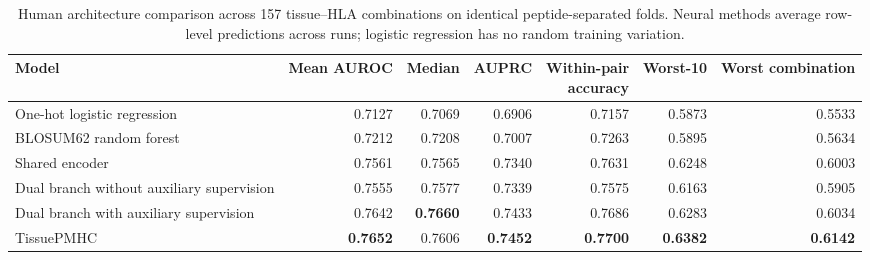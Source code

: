 \begin{table}[t]
\centering
\caption{Human architecture comparison across 157 tissue--HLA combinations on identical peptide-separated folds. Neural methods average row-level predictions across runs; logistic regression has no random training variation.}
\label{tab:human-strict-architectures}
\fontsize{7.5}{8.5}\selectfont
\renewcommand{\arraystretch}{0.98}
\setlength{\tabcolsep}{2pt}
\begin{tabularx}{\textwidth}{>{\raggedright\arraybackslash}Xrrrrrr}
\toprule
Model & Mean AUROC & Median & AUPRC & \shortstack{Within-pair\\accuracy} & Worst-10 & Worst combination \\
\midrule
One-hot logistic regression & 0.7127 & 0.7069 & 0.6906 & 0.7157 & 0.5873 & 0.5533 \\
BLOSUM62 random forest & 0.7212 & 0.7208 & 0.7007 & 0.7263 & 0.5895 & 0.5634 \\
Shared encoder & 0.7561 & 0.7565 & 0.7340 & 0.7631 & 0.6248 & 0.6003 \\
Dual branch without auxiliary supervision & 0.7555 & 0.7577 & 0.7339 & 0.7575 & 0.6163 & 0.5905 \\
Dual branch with auxiliary supervision & 0.7642 & \textbf{0.7660} & 0.7433 & 0.7686 & 0.6283 & 0.6034 \\
TissuePMHC & \textbf{0.7652} & 0.7606 & \textbf{0.7452} & \textbf{0.7700} & \textbf{0.6382} & \textbf{0.6142} \\
\bottomrule
\end{tabularx}
\end{table}

